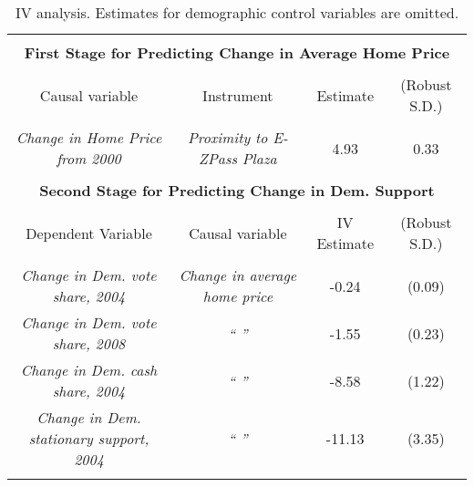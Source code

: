 \begin{table}[!htbp] \centering 
  \caption{IV analysis. Estimates for demographic control variables are omitted.} 
  \label{iv_analysis} 
\footnotesize \begin{tabular}{@{\extracolsep{5pt}} cccc} 
\\[-1.8ex]\hline 
\hline \\[-1.8ex] 
\multicolumn{4}{c}{\textbf{First Stage for Predicting Change in Average Home Price}} \\ 
\hline \\[-1.8ex] 
Causal variable & Instrument & Estimate & (Robust S.D.) \\ 
\hline \\[-1.8ex] 
\emph{Change in Home Price from 2000} & \emph{Proximity to E-ZPass Plaza} & 4.93 & 0.33 \\ 

\rule{0pt}{3ex}  & & & \\ 
\multicolumn{4}{c}{\textbf{Second Stage for Predicting  Change in Dem. Support}} \\ 
\hline \\[-1.8ex] 
Dependent Variable & Causal variable & IV Estimate & (Robust S.D.) \\ 
\hline \\[-1.8ex] 
\emph{Change in Dem. vote share, 2004} & \emph{Change in average home price} &  -0.24 &  (0.09) \\ 

\emph{Change in Dem. vote share, 2008} & \emph{ `` ''  } &-1.55 & (0.23) \\ 

\emph{Change in Dem. cash share, 2004}  & \emph{ `` ''  } & -8.58 & (1.22) \\

\emph{Change in Dem. stationary support, 2004} & \emph{  `` '' } & -11.13 & (3.35) \\ 
\hline \\[-1.8ex] 
\end{tabular} 
\end{table} 